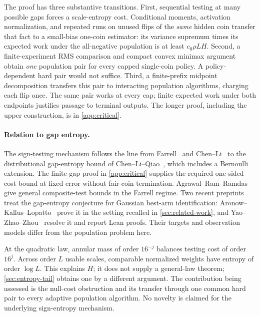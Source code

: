 The proof has three substantive transitions. First, sequential testing
at many possible gaps forces a scale-entropy cost. Conditional moments,
activation normalization, and repeated runs on unused flips of the
\emph{same} hidden coin transfer that fact to a small-bias one-coin
estimator: its variance supremum times its expected work under the
all-negative population is at least $c_0\rho LH$.
Second, a finite-experiment RMS comparison and compact convex minimax
argument obtain \emph{one} population pair for every capped single-coin
policy. A policy-dependent hard pair would not suffice.
Third, a finite-prefix midpoint decomposition transfers this pair to
interacting population algorithms, charging each flip once. The same
pair works at every cap; finite expected work under both endpoints
justifies passage to terminal outputs. The longer proof, including the
upper construction, is in \cref{app:critical}.

\paragraph{Relation to gap entropy.}
The sign-testing mechanism follows the line from Farrell~\cite{farrell}
and Chen--Li~\cite{chenli} to the distributional gap-entropy bound of
Chen--Li--Qiao~\cite[Lemma 4.1 and Remark D.4]{clq}, which includes a
Bernoulli extension. The finite-gap proof in \cref{app:critical} supplies
the required one-sided cost bound at fixed error without fair-coin
termination. Agrawal--Ram--Ramdas~\cite{agrawal} give general
composite-test bounds in the Farrell regime. Two recent preprints treat
the gap-entropy conjecture for Gaussian best-arm identification:
Aronow--Kallus--Lopatto~\cite{akl} prove it in the setting recalled in
\cref{sec:related-work}, and Yao--Zhao--Zhou~\cite{yao} resolve it and
report Lean proofs. Their targets and observation models differ from the
population problem here.

At the quadratic law, annular mass of order $16^{-j}$ balances testing
cost of order $16^j$. Across order $L$ usable scales, comparable
normalized weights have entropy of order $\log L$. This explains $H$;
it does not supply a general-law theorem; \cref{sec:entropy-tail} obtains
one by a different argument. The contribution being assessed
is the null-cost obstruction and its transfer through one common hard
pair to every adaptive population algorithm. No novelty is claimed for
the underlying sign-entropy mechanism.

